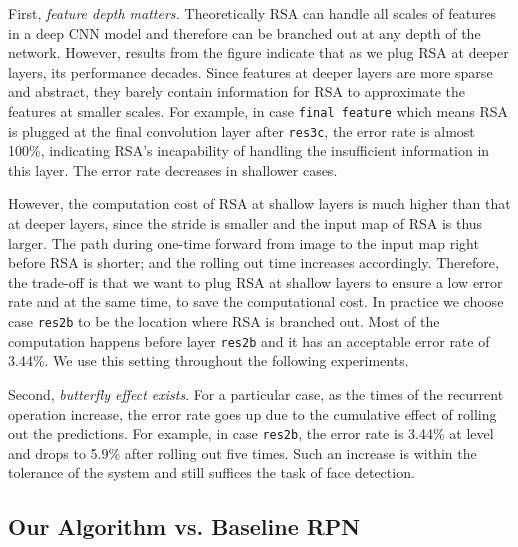 \documentclass[10pt,twocolumn,letterpaper]{article}
\begin{document}
First, \textit{feature depth matters.}
Theoretically RSA can handle all scales of features in a deep CNN model and therefore can be branched out at any depth of the network. 
However, results from the figure indicate that as we plug RSA at deeper layers, its performance decades. 
Since features at deeper layers are more sparse and abstract, they barely contain information for RSA to approximate the features at smaller scales. 
For example, in case \texttt{final feature} which means RSA is plugged at the final convolution layer after \texttt{res3c}, the error rate is almost 100\%, indicating RSA's incapability of handling the insufficient information in this layer. 
The error rate decreases in shallower cases.


However, the computation cost of RSA at shallow layers 
is much higher than that at deeper layers, since the stride is smaller and the input map of RSA is thus larger.
The path during one-time forward from image to the input map right before RSA is shorter; and the rolling out time increases accordingly.
Therefore, the trade-off is that we want to plug RSA at shallow layers to ensure a low error rate and at the same time, to save the computational cost.
In practice we choose case \texttt{res2b} to 
be the location where RSA is branched out. Most of the computation happens before layer  \texttt{res2b} and it has an acceptable error rate of 3.44\%. We use this setting throughout the following experiments. 

Second, \textit{butterfly effect exists}. For a particular case, as the times of the recurrent operation increase, the error rate goes up due to the cumulative effect of rolling out the predictions.
For example, in case \texttt{res2b}, the error rate is 3.44\% at level  and drops to 5.9\% after rolling out five times. Such an increase is within the tolerance of the system and still suffices the task of face detection.














\subsection{Our Algorithm vs. Baseline RPN}\label{sec:vsbase}
\end{document}
